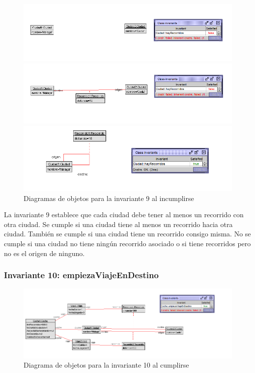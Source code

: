 \documentclass[12pt.a4paper]{article}
\begin{document}
  \begin{figure}[H]
    \centering
    \begin{minipage}{0.49\textwidth}
        \centering
        \includegraphics[width=\linewidth]{Soils/9_v2.png}
    \end{minipage}
    \hfill
    \begin{minipage}{0.49\textwidth}
        \centering
        \includegraphics[width=\linewidth]{Soils/9_v3.png}
    \end{minipage}
    \hfill
        \centering
        \includegraphics[width=0.7\linewidth]{Soils/9_v4.png}
    \caption{Diagramas de objetos para la invariante 9 al incumplirse}
\end{figure}

La invariante 9 establece que cada ciudad debe tener al menos un recorrido con otra ciudad. Se cumple si una ciudad tiene al menos un recorrido hacia otra ciudad. También se cumple si una ciudad tiene un recorrido consigo misma. No se cumple si una ciudad no tiene ningún recorrido asociado o si tiene recorridos pero no es el origen de ninguno.

\subsubsection{Invariante 10: empiezaViajeEnDestino}

\vspace{1.0 cm}
\begin{figure}[H]
     \includegraphics[width=1\linewidth]{Soils/10.png}
     \caption{Diagrama de objetos para la invariante 10 al cumplirse}
\end{figure}
\end{document}
